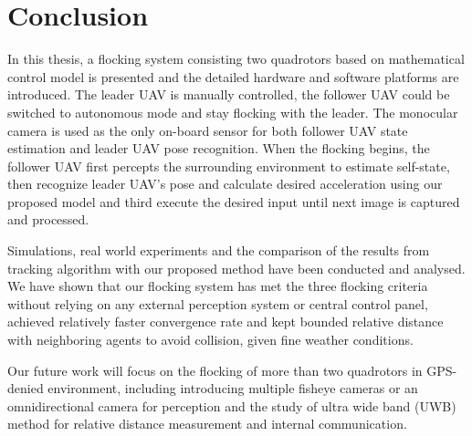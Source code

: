 \chapter{Conclusion}\label{conclusion}

In this thesis, a flocking system consisting two quadrotors based on mathematical control model is presented and the detailed hardware and software platforms are introduced. The leader UAV is manually controlled, the follower UAV could be switched to autonomous mode and stay flocking with the leader. The monocular camera is used as the only on-board sensor for both follower UAV state estimation and leader UAV pose recognition. When the flocking begins, the follower UAV first percepts the surrounding environment to estimate self-state, then recognize leader UAV's pose and calculate desired acceleration using our proposed model and third execute the desired input until next image is captured and processed.

Simulations, real world experiments and the comparison of the results from tracking algorithm with our proposed method have been conducted and analysed. We have shown that our flocking system has met the three flocking criteria without relying on any external perception system or central control panel, achieved relatively faster convergence rate and kept bounded relative distance with neighboring agents to avoid collision, given fine weather conditions.

Our future work will focus on the flocking of more than two quadrotors in GPS-denied environment, including introducing multiple fisheye cameras or an omnidirectional camera for perception and the study of ultra wide band (UWB) method for relative distance measurement and internal communication.
